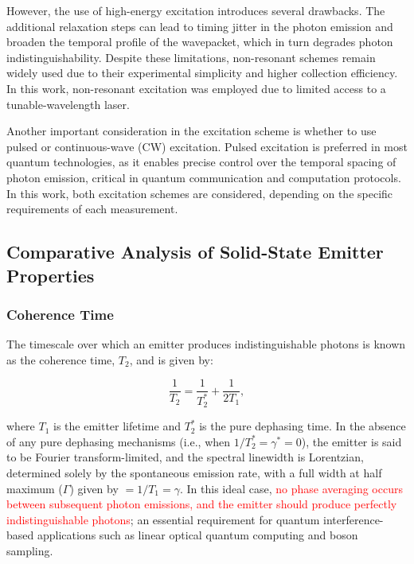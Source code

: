 However, the use of high-energy excitation introduces several drawbacks. The additional relaxation steps can lead to timing jitter in the photon emission and broaden the temporal profile of the wavepacket, which in turn degrades photon indistinguishability. Despite these limitations, non-resonant schemes remain widely used due to their experimental simplicity and higher collection efficiency. In this work, non-resonant excitation was employed due to limited access to a tunable-wavelength laser.

Another important consideration in the excitation scheme is whether to use pulsed or continuous-wave (CW) excitation. Pulsed excitation is preferred in most quantum technologies, as it enables precise control over the temporal spacing of photon emission, critical in quantum communication and computation protocols. In this work, both excitation schemes are considered, depending on the specific requirements of each measurement.



\subsection{Comparative Analysis of Solid-State Emitter Properties}

\subsubsection{\label{sec:coherence-time} Coherence Time}

The timescale over which an emitter produces indistinguishable photons is known as the coherence time, $T_2$, and is given by:

\begin{equation}
    \frac{1}{T_2} = \frac{1}{T_2^*} + \frac{1}{2T_1},
    \label{eqn:coherence_time}
\end{equation}

where $T_1$ is the emitter lifetime and $T_2^*$ is the pure dephasing time. In the absence of any pure dephasing mechanisms (i.e., when $1/T_2^* = \gamma^* = 0$), the emitter is said to be Fourier transform-limited, and the spectral linewidth is Lorentzian, determined solely by the spontaneous emission rate, with a full width at half maximum ($\Gamma$) given by $ = 1/T_1 = \gamma$. In this ideal case, \textcolor{red}{no phase averaging occurs between subsequent photon emissions, and the emitter should produce perfectly indistinguishable photons}; an essential requirement for quantum interference-based applications such as linear optical quantum computing and boson sampling.

